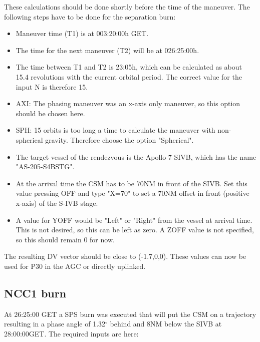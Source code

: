 \documentclass[11pt]{article} %
\begin{document}
These calculations should be done shortly before the time of the maneuver. The following steps have to be done for the separation burn:

\begin{itemize}
	\item{Maneuver time (T1) is at 003:20:00h GET.}
	\item{The time for the next maneuver (T2) will be at 026:25:00h.}
	\item{The time between T1 and T2 is 23:05h, which can be calculated as about 15.4 revolutions with the current orbital period. The correct value for the input N is therefore 15.}
	\item{AXI: The phasing maneuver was an x-axis only maneuver, so this option should be chosen here.}
	\item{SPH: 15 orbits is too long a time to calculate the maneuver with non-spherical gravity. Therefore choose the option "Spherical".}
	\item{The target vessel of the rendezvous is the Apollo 7 SIVB, which has the name "AS-205-S4BSTG".}
	\item{At the arrival time the CSM has to be 70NM in front of the SIVB. Set this value pressing OFF and type "X=70" to set a 70NM offset in front (positive x-axis) of the S-IVB stage. }
	\item{A value for YOFF would be "Left" or "Right" from the vessel at arrival time. This is not desired, so this can be left as zero. A ZOFF value is not specified, so this should remain 0 for now.}
\end{itemize}

The resulting DV vector should be close to (-1.7,0,0). These values can now be used for P30 in the AGC or directly uplinked.\\

\subsection{NCC1 burn}

At 26:25:00 GET a SPS burn was executed that will put the CSM on a trajectory resulting in a phase angle of 1.32$^{\circ}$ behind and 8NM below the SIVB at 28:00:00GET. The required inputs are here:
\end{document}
